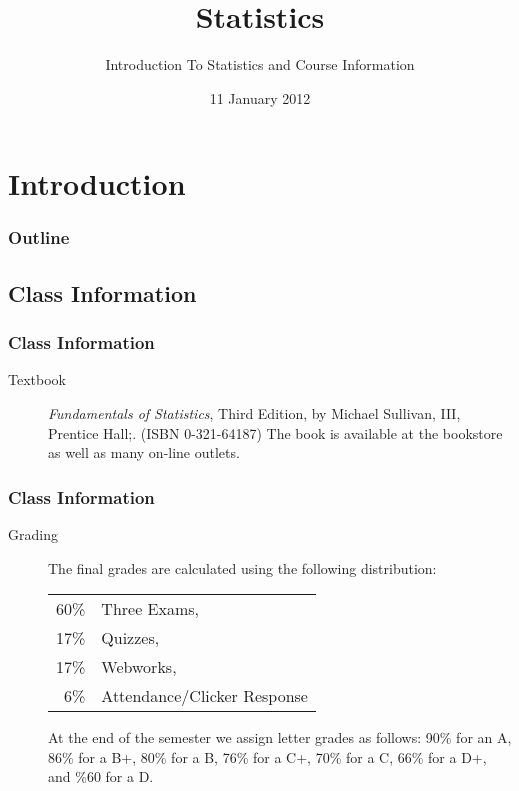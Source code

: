 
\section{Introduction}

\title{Statistics}
\subtitle{Introduction To Statistics and Course Information}

\date{11 January 2012}

\begin{frame}
  \titlepage
\end{frame}

\begin{frame}
  \frametitle{Outline}
  \tableofcontents[pausesection,hideothersubsections,sectionstyle=show/hide]
\end{frame}


\subsection{Class Information}


\begin{frame}
  \frametitle{Class Information}

\begin{description}
\item[Textbook] {\em Fundamentals of Statistics}, Third Edition, by
  Michael Sullivan, III, Prentice Hall;. (ISBN 0-321-64187) The book
  is available at the bookstore as well as many on-line outlets.

\end{description}

\end{frame}


\begin{frame}
  \frametitle{Class Information}

\begin{description}
\item[Grading] %
  
  The final grades are calculated using the following distribution:
    \begin{tabular}[t]{rl}
      60\% & Three Exams, \\
      17\% & Quizzes, \\
      17\% & Webworks, \\
      6\%  & Attendance/Clicker Response \\
    \end{tabular}
  
    At the end of the semester we assign letter grades as follows:
    90\% for an A, 86\% for a B+, 80\% for a B, 76\% for a C+, 70\%
    for a C, 66\% for a D+, and \%60 for a D.
\end{description}

\end{frame}




